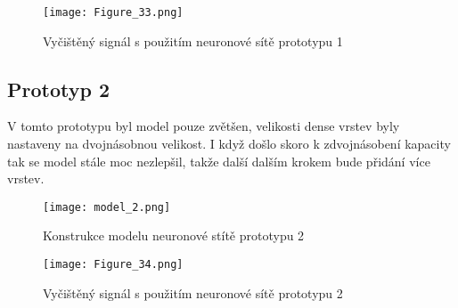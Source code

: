 \begin{landscape}
\begin{figure}[H] 
	\centering
	\texttt{[image: Figure\_33.png]}
	\caption{Vyčištěný signál s použitím neuronové sítě prototypu 1}
\end{figure}
\end{landscape}


\subsection{Prototyp 2}

V tomto prototypu byl model pouze zvětšen, velikosti dense vrstev byly nastaveny na dvojnásobnou velikost. I když došlo skoro k zdvojnásobení kapacity tak se model stále moc nezlepšil, takže další dalším krokem bude přidání více vrstev.

\begin{figure}[H] 
	\centering
	\texttt{[image: model\_2.png]}
	\caption{Konstrukce modelu neuronové stítě prototypu 2}
\end{figure}

\begin{landscape}
	\begin{figure}[H] 
		\centering
		\texttt{[image: Figure\_34.png]}
		\caption{Vyčištěný signál s použitím neuronové sítě prototypu 2}
	\end{figure}
	\end{landscape}